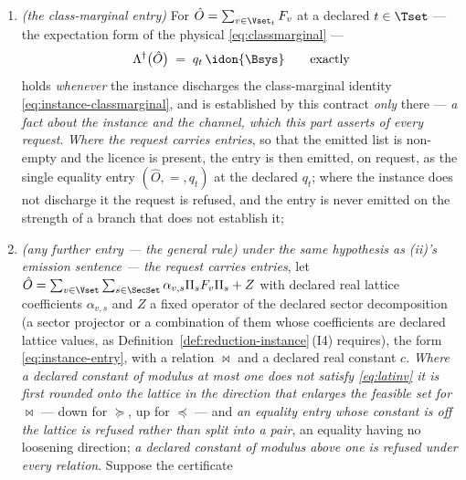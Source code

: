 \begin{corollary}
\begin{enumerate}[label=(\roman*),leftmargin=3.0em]
  and whatever the request carries, as the certificate case of
  Corollary~\ref{cor:pullback}\,(ii) that entry records, and it becomes an
  entry of $\CList$ only where a caller requests it \emph{as an entry} ---
  a request that makes the emitted list non-empty and so brings the licence
  with it;
\item \emph{(the class-marginal entry)} For $\hat O=\sum_{v\in\Vset_t}F_v$ at
  a declared $t\in\Tset$ --- the expectation form of the physical
   \eqref{eq:classmarginal} ---
  \begin{equation}\label{eq:entryclass}
    \Lambda^{\dagger}\big(\hat O\big)\;=\;q_t\,\idon{\Bsys}
    \qquad\text{exactly}
  \end{equation}
  holds \emph{whenever} the instance discharges the class-marginal identity
  \eqref{eq:instance-classmarginal}, and is established by this contract
  \emph{only} there --- \emph{a fact about the instance and the channel, which
  this part asserts of every request}. \emph{Where the request carries
  entries}, so that the emitted list is non-empty and the licence is present,
  the entry is then emitted, on request, as the single equality entry
  $(\hat O,=,q_t)$ at the declared $q_t$; where the instance does not
  discharge it the request is refused, and the entry is never emitted
  on the strength of a branch that does not establish it;
\item \emph{(any further entry --- the general rule)} \emph{under the same
  hypothesis as (ii)'s emission sentence --- the request carries entries},
  let
  $\hat O=\sum_{v\in\Vset}\sum_{s\in\SecSet}\alpha_{v,s}\Pi_sF_v\Pi_s+Z$ with
  declared real lattice coefficients $\alpha_{v,s}$ and $Z$ a fixed operator
  of the declared sector decomposition (a sector projector or a combination
  of them whose coefficients are declared lattice values, as
  Definition~\ref{def:reduction-instance}\,(I4) requires), the form
  \eqref{eq:instance-entry}, with a relation
  $\bowtie$ and a declared real constant $c$.
  \emph{Where a declared constant of modulus at most one does not satisfy
  \eqref{eq:latinv} it is first rounded onto the lattice in the direction that
  enlarges the feasible set for $\bowtie$} --- down for $\succeq$, up for
  $\preceq$ --- and \emph{an equality entry whose constant is off the lattice
  is refused rather than split into a pair}, an equality having no loosening
  direction; \emph{a declared constant of modulus above one is refused under
  every relation}. Suppose the certificate
  \begin{equation}\label{eq:entrygeneral}

\end{equation}
\end{enumerate}
\end{corollary}
